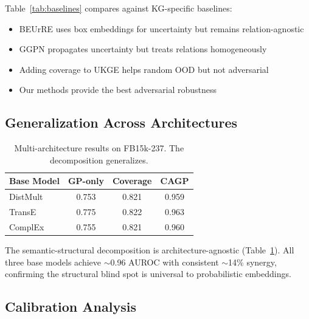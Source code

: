 Table~\ref{tab:baselines} compares against KG-specific baselines:
\begin{itemize}
    \item BEUrRE uses box embeddings for uncertainty but remains relation-agnostic
    \item GGPN propagates uncertainty but treats relations homogeneously
    \item Adding coverage to UKGE helps random OOD but not adversarial
    \item Our methods provide the best adversarial robustness
\end{itemize}

\subsection{Generalization Across Architectures}

\begin{table}[t]
\centering
\caption{Multi-architecture results on FB15k-237. The decomposition generalizes.}
\label{tab:multimodel}
\vspace{0.5em}
\small
\begin{tabular}{lccc}
\toprule
Base Model & GP-only & Coverage & CAGP \\
\midrule
DistMult & 0.753 & 0.821 & 0.959 \\
TransE & 0.775 & 0.822 & 0.963 \\
ComplEx & 0.755 & 0.821 & 0.960 \\
\bottomrule
\end{tabular}
\end{table}

The semantic-structural decomposition is architecture-agnostic (Table~\ref{tab:multimodel}).
All three base models achieve $\sim$0.96 AUROC with consistent $\sim$14\% synergy, confirming the structural blind spot is universal to probabilistic embeddings.

\subsection{Calibration Analysis}

